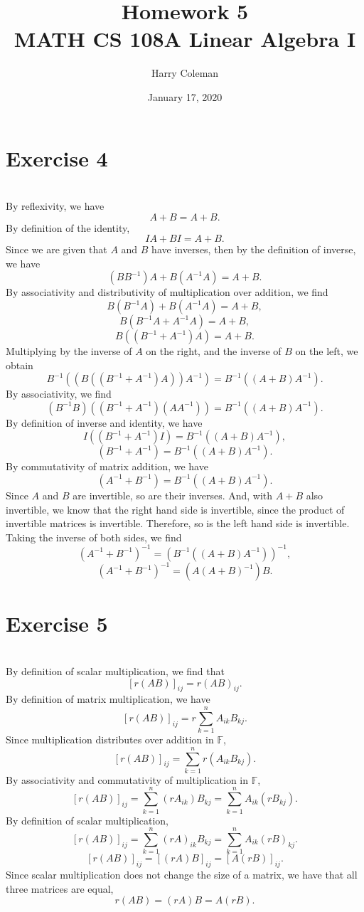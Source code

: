 \documentclass[12pt]{article}
\newcommand{\F}{\mathbb{F}}
\begin{document}
 
\title{Homework 5\\
    \large MATH CS 108A Linear Algebra I}
\author{Harry Coleman}
\date{January 17, 2020}

\maketitle

\section*{Exercise 4 }
\\

By reflexivity, we have
\[A+B = A+B.\]
By definition of the identity,
\[IA + BI = A+B.\]
Since we are given that $A$ and $B$ have inverses, then by the definition of inverse, we have
\[(BB^{-1})A + B(A^{-1}A) = A+B.\]
By associativity and distributivity of multiplication over addition, we find
\[B(B^{-1}A) + B(A^{-1}A) = A+B,\]
\[B(B^{-1}A + A^{-1}A) = A+B,\]
\[B((B^{-1} + A^{-1})A) = A+B.\]
Multiplying by the inverse of $A$ on the right, and the inverse of $B$ on the left, we obtain
\[B^{-1}((B((B^{-1} + A^{-1})A))A^{-1}) = B^{-1}((A+B)A^{-1}).\]
By associativity, we find
\[(B^{-1}B)((B^{-1} + A^{-1})(AA^{-1})) = B^{-1}((A+B)A^{-1}).\]
By definition of inverse and identity, we have
\[I((B^{-1} + A^{-1})I) = B^{-1}((A+B)A^{-1}),\]
\[(B^{-1} + A^{-1}) = B^{-1}((A+B)A^{-1}).\]
By commutativity of matrix addition, we have
\[(A^{-1} + B^{-1}) = B^{-1}((A+B)A^{-1}).\]
Since $A$ and $B$ are invertible, so are their inverses. And, with $A+B$ also invertible, we know that the right hand side is invertible, since the product of invertible matrices is invertible. Therefore, so is the left hand side is invertible. Taking the inverse of both sides, we find
\[(A^{-1} + B^{-1})^{-1} = (B^{-1}((A+B)A^{-1}))^{-1},\]
\[(A^{-1} + B^{-1})^{-1} = (A(A+B)^{-1})B.\]


\section*{Exercise 5}
\fbox{
    \parbox{\textwidth} {
        Show that $r(AB) = (rA)B = A(rB)$, where $r \in \F, A\in \F^{m\times n}$ and $B \in \F^{n\times p}$.
    }
}
\\

By definition of scalar multiplication, we find that
\[[r(AB)]_{ij} = r(AB)_{ij}.\]
By definition of matrix multiplication, we have
\[[r(AB)]_{ij} = r\sum_{k=1}^n A_{ik}B_{kj}.\]
Since multiplication distributes over addition in $\F$,
\[[r(AB)]_{ij} = \sum_{k=1}^n r(A_{ik}B_{kj}).\]
By associativity and commutativity of multiplication in $\F$,
\[[r(AB)]_{ij} = \sum_{k=1}^n (rA_{ik})B_{kj} = \sum_{k=1}^n A_{ik}(rB_{kj}).\]
By definition of scalar multiplication,
\[[r(AB)]_{ij} = \sum_{k=1}^n (rA)_{ik}B_{kj} = \sum_{k=1}^n A_{ik}(rB)_{kj}.\]
\[[r(AB)]_{ij} = [(rA)B]_{ij} = [A(rB)]_{ij}.\]
Since scalar multiplication does not change the size of a matrix, we have that all three matrices are equal,
\[r(AB) = (rA)B = A(rB).\]
\end{document}
